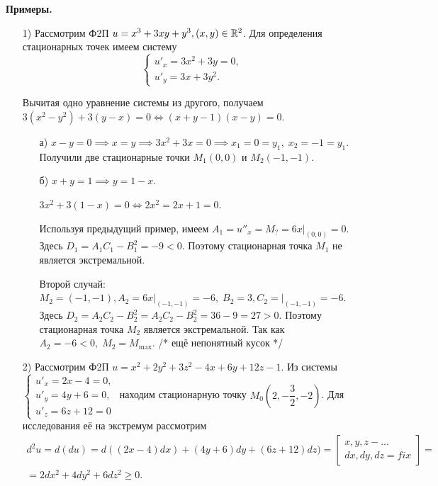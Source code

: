 \documentclass[../../main.tex]{subfiles}
\begin{document}
\noindent\textbf{Примеры.}
\begin{itemize}
	\item[1)] Рассмотрим Ф2П $u = x^3 + 3xy + y^3, (x,y) \in \mathbb{R}^2$. Для
 определения стационарных точек имеем систему 
\[\begin{cases}
u'_x = 3x^2 + 3y = 0, \\
u'_y = 3x + 3y^2.
\end{cases} \]

Вычитая одно уравнение системы из другого, получаем $3(x^2 - y^2) + 3(y - x)
 = 0 \iff (x+y-1)(x-y)=0$.
\begin{itemize}
\item[а)] $x - y = 0 \implies x = y \implies 3x^2 + 3x = 0 \implies 
x_1 = 0 = y_1, \; x_2 = -1 = y_1.$ 
Получили две стационарные точки $M_1(0,0)$ и $M_2(-1,-1)$.
\item[б)] $x+y=1 \implies y = 1-x$.

$3x^2 + 3(1-x) = 0 \iff 2x^2 = 2x+1=0$. 

Используя предыдущий пример, имеем 
$A_1 = u''_x = M_? = 6x \bigg|_{(0,0)} = 0$. Здесь $D_1 = A_1C_1 - B_1^2 = 
-9 < 0$. Поэтому стационарная точка $M_1$ не является экстремальной.

Второй случай: $M_2 = (-1, -1), A_2 = 6x \bigg|_{(-1,-1)} = -6, \;
B_2 = 3, C_2 = \bigg|_{(-1,-1)} = -6$. Здесь $D_2 = A_2C_2 - B_2^2 = 
A_2C_2 - B_2^2 = 36 - 9 = 27 > 0$. Поэтому стационарная точка $M_2$
является экстремальной. Так как $A_2 = -6 < 0, \; M_2 = M_{\max}$.
/* ещё непонятный кусок */
\end{itemize}
\item[2)] Рассмотрим Ф2П $u = x^2 + 2y^2 + 3z^2 - 4x + 6y +12z-1$.
Из системы 
$\begin{cases}
u'_x = 2x-4 = 0, \\
u'_y = 4y+6 = 0, \\
u'_z = 6z+12 = 0
\end{cases}$ находим стационарную точку 
 $M_0\left(2, -\dfrac32, -2\right)$. 
Для исследования её на экстремум рассмотрим 
\begin{multline*}
d^2u = d(du) = d((2x-4)dx)+(4y+6)dy+(6z+12)dz) = 
\left[
\begin{gathered}
x, y, z - \text{...} \\
dx, dy, dz = fix
\end{gathered}
\right] = \\ = 2dx^2 + 4dy^2 + 6dz^2 \geq 0.
\end{multline*}


\end{itemize}
\end{document}
